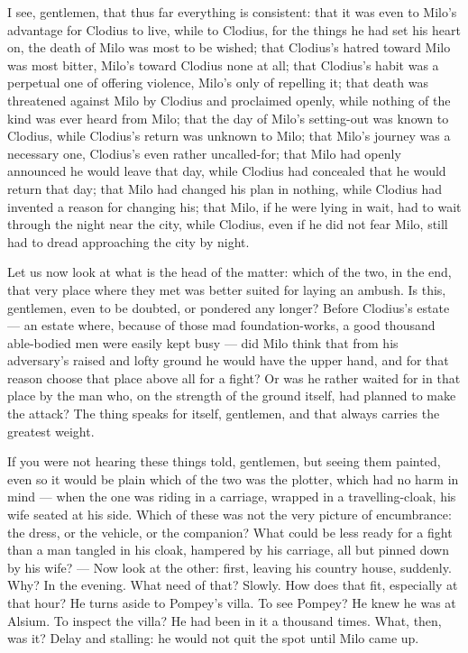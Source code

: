  I see, gentlemen, that thus far everything is consistent: that it was even to Milo's advantage for Clodius to live, while to Clodius, for the things he had set his heart on, the death of Milo was most to be wished; that Clodius's hatred toward Milo was most bitter, Milo's toward Clodius none at all; that Clodius's habit was a perpetual one of offering violence, Milo's only of repelling it; that death was threatened against Milo by Clodius and proclaimed openly, while nothing of the kind was ever heard from Milo; that the day of Milo's setting-out was known to Clodius, while Clodius's return was unknown to Milo; that Milo's journey was a necessary one, Clodius's even rather uncalled-for; that Milo had openly announced he would leave that day, while Clodius had concealed that he would return that day; that Milo had changed his plan in nothing, while Clodius had invented a reason for changing his; that Milo, if he were lying in wait, had to wait through the night near the city, while Clodius, even if he did not fear Milo, still had to dread approaching the city by night.

 Let us now look at what is the head of the matter: which of the two, in the end, that very place where they met was better suited for laying an ambush. Is this, gentlemen, even to be doubted, or pondered any longer? Before Clodius's estate --- an estate where, because of those mad foundation-works, a good thousand able-bodied men were easily kept busy --- did Milo think that from his adversary's raised and lofty ground he would have the upper hand, and for that reason choose that place above all for a fight? Or was he rather waited for in that place by the man who, on the strength of the ground itself, had planned to make the attack? The thing speaks for itself, gentlemen, and that always carries the greatest weight.

 If you were not hearing these things told, gentlemen, but seeing them painted, even so it would be plain which of the two was the plotter, which had no harm in mind --- when the one was riding in a carriage, wrapped in a travelling-cloak, his wife seated at his side. Which of these was not the very picture of encumbrance: the dress, or the vehicle, or the companion? What could be less ready for a fight than a man tangled in his cloak, hampered by his carriage, all but pinned down by his wife? --- Now look at the other: first, leaving his country house, suddenly. Why? In the evening. What need of that? Slowly. How does that fit, especially at that hour? He turns aside to Pompey's villa. To see Pompey? He knew he was at Alsium. To inspect the villa? He had been in it a thousand times. What, then, was it? Delay and stalling: he would not quit the spot until Milo came up.

